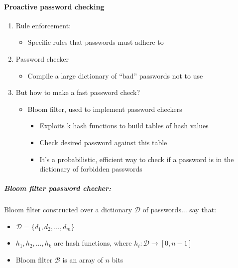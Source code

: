 \documentclass{article}
\begin{document}
            \paragraph{Proactive password checking}
                    \begin{enumerate}
                        \item Rule enforcement:
                        \begin{itemize}
                            \item Specific rules that passwords must adhere to
                        \end{itemize}    
                        \item Password checker
                            \begin{itemize}
                                \item Compile a large dictionary of “bad” passwords not to use
                            \end{itemize}
                        \item But how to make a fast password check?
                            \begin{itemize}
                                \item Bloom filter, used to implement password checkers
                            \begin{itemize}
                                \item Exploits k hash functions to build tables of hash values
                                \item Check desired password against this table
                                \item It’s a probabilistic, efficient way to check if a password is in the dictionary of forbidden passwords
                            \end{itemize} 
                            \end{itemize}
                            
                        
                    \end{enumerate}
                    \subparagraph{Bloom filter password checker:}
                    Bloom filter constructed over a dictionary \( \mathcal{D} \) of passwords... say that:
                    \begin{itemize}
                        \item \( \mathcal{D} = \{ d_1, d_2, \ldots, d_m \} \)
                        \item \( h_1, h_2, \ldots, h_k \) are hash functions, where \( h_i: \mathcal{D} \to [0, n-1] \)
                        \item Bloom filter \( \mathcal{B} \) is an array of \( n \) bits
                    \end{itemize}
                    
\end{document}

